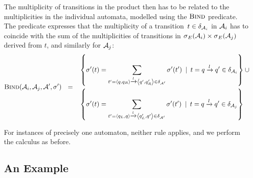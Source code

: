 The multiplicity of transitions in the product then has to be related
to the multiplicities in the individual automata, modelled using the
$\textsc{Bind}$ predicate. The predicate expresses that the multiplicity
of a transition~$t \in \delta_{\mathcal{A}_i}$ in
$\mathcal{A}_i$ has to coincide with the sum of the multiplicities of
transitions in $\operatorname{\sigma}_{E}(\mathcal{A}_i) \times \operatorname{\sigma}_{E}(\mathcal{A}_j)$ derived from $t$,
and similarly for $\mathcal{A}_j$:
%
  $$
  \textsc{Bind}(\mathcal{A}_i, \mathcal{A}_j, \mathcal{A}', \operatorname{\sigma}') ~~=~~
  \begin{aligned}
  & \left\{ 
    \operatorname{\sigma}'(t)  =  \sum\limits_{t' = \left\langle q, q_R\right\rangle \xrightarrow{l} \left\langle q', q'_R\right\rangle \in \delta_{\mathcal{A}'}} \operatorname{\sigma}'(t')
  \:\mid\: t = q \xrightarrow{l} q' \in \delta_{\mathcal{A}_i} \right\} \cup\mbox{} \\ 
  & \left\{
    \operatorname{\sigma}'(t)  =  \sum\limits_{t' = \left\langle q_L, q\right\rangle \xrightarrow{l} \left\langle q'_L, q'\right\rangle \in \delta_{\mathcal{A}'}} \operatorname{\sigma}'(t') \:\mid\: t = q \xrightarrow{l} q' \in \delta_{\mathcal{A}_j}
  \right\}
  \end{aligned}
$$

For instances of precisely one automaton, neither rule applies, and we perform
the calculus as before.

\subsection{An Example}\label{sec:multiple:example}



